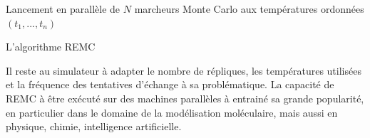 \begin{algorithm}

  Lancement en parallèle de $N$ marcheurs Monte Carlo aux températures ordonnées $(t_1,...,t_n)$ \;
\caption{L'algorithme REMC}\label{algoREMC}
\end{algorithm}


Il reste au simulateur à adapter le nombre de répliques, les températures utilisées et la fréquence des tentatives d'échange à sa problématique. La capacité de REMC à être exécuté sur des machines parallèles à entrainé sa grande popularité, en particulier dans le domaine de la modélisation moléculaire, mais aussi en physique, chimie, intelligence artificielle.

